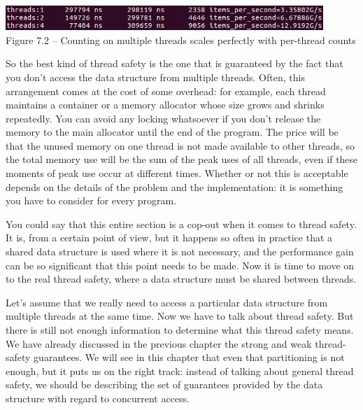 \begin{center}
\includegraphics[width=0.9\textwidth]{content/2/chapter7/images/2.jpg}\\
Figure 7.2 – Counting on multiple threads scales perfectly with per-thread counts
\end{center}

So the best kind of thread safety is the one that is guaranteed by the fact that you don't access the data structure from multiple threads. Often, this arrangement comes at the cost of some overhead: for example, each thread maintains a container or a memory allocator whose size grows and shrinks repeatedly. You can avoid any locking whatsoever if you don't release the memory to the main allocator until the end of the program. The price will be that the unused memory on one thread is not made available to other threads, so the total memory use will be the sum of the peak uses of all threads, even if these moments of peak use occur at different times. Whether or not this is acceptable depends on the details of the problem and the implementation: it is something you have to consider for every program.

You could say that this entire section is a cop-out when it comes to thread safety. It is, from a certain point of view, but it happens so often in practice that a shared data structure is used where it is not necessary, and the performance gain can be so significant that this point needs to be made. Now it is time to move on to the real thread safety, where a data structure must be shared between threads.


Let's assume that we really need to access a particular data structure from multiple threads at the same time. Now we have to talk about thread safety. But there is still not enough information to determine what this thread safety means. We have already discussed in the previous chapter the strong and weak thread-safety guarantees. We will see in this chapter that even that partitioning is not enough, but it puts us on the right track: instead of talking about general thread safety, we should be describing the set of guarantees provided by the data structure with regard to concurrent access.

